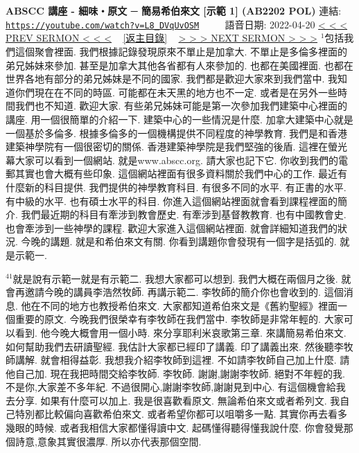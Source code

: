 \documentclass{book}
\begin{document}
\section{}
\label{sec:L8_DVqUvOSM}
\textbf{ABSCC 講座 - 細味‧原文 ─ 簡易希伯來文 [示範 1] (AB2202 POL)}
\newline
\newline
連結: \href{https://youtube.com/watch?v=L8_DVqUvOSM}{\texttt{https://youtube.com/watch?v=L8\_DVqUvOSM}} ~~~~ 語音日期: 2022-04-20
\newline
\newline
\hyperref[sec:GA78znQ7bg4]{\small{< < < PREV SERMON < < <}}
~
\hyperref[sec:index]{\small{[返主目錄]}}
~
\hyperref[sec:efm9yyrZOo0]{\small{> > > NEXT SERMON > > >}}
\newline
\newline
$^{1}$包括我們這個聚會裡面.
我們根據記錄發現原來不單止是加拿大.
不單止是多倫多裡面的弟兄姊妹來參加.
甚至是加拿大其他各省都有人來參加的.
也都在美國裡面.
也都在世界各地有部分的弟兄姊妹是不同的國家.
我們都是歡迎大家來到我們當中.
我知道你們現在在不同的時區.
可能都在未天黑的地方也不一定.
或者是在另外一些時間我們也不知道.
歡迎大家.
有些弟兄姊妹可能是第一次參加我們建築中心裡面的講座.
用一個很簡單的介紹一下.
建築中心的一些情況是什麼.
加拿大建築中心就是一個基於多倫多.
根據多倫多的一個機構提供不同程度的神學教育.
我們是和香港建築神學院有一個很密切的關係.
香港建築神學院是我們堅強的後盾.
這裡在螢光幕大家可以看到一個網站.
就是www.abscc.org.
請大家也記下它.
你收到我們的電郵其實也會大概有些印象.
這個網站裡面有很多資料關於我們中心的工作.
最近有什麼新的科目提供.
我們提供的神學教育科目.
有很多不同的水平.
有正書的水平.
有中級的水平.
也有碩士水平的科目.
你進入這個網站裡面就會看到課程裡面的簡介.
我們最近期的科目有牽涉到教會歷史.
有牽涉到基督教教育.
也有中國教會史.
也會牽涉到一些神學的課程.
歡迎大家進入這個網站裡面.
就會詳細知道我們的狀況.
今晚的講題.
就是和希伯來文有關.
你看到講題你會發現有一個字是括弧的.
就是示範一.

$^{41}$就是說有示範一就是有示範二.
我想大家都可以想到.
我們大概在兩個月之後.
就會再邀請今晚的講員李浩然牧師.
再講示範二.
李牧師的簡介你也會收到的.
這個消息.
他在不同的地方也教授希伯來文.
大家都知道希伯來文是《舊約聖經》裡面一個重要的原文.
今晚我們很榮幸有李牧師在我們當中.
李牧師是非常年輕的.
大家可以看到.
他今晚大概會用一個小時.
來分享耶利米哀歌第三章.
來講簡易希伯來文.
如何幫助我們去研讀聖經.
我估計大家都已經印了講義.
印了講義出來.
然後聽李牧師講解.
就會相得益彰.
我想我介紹李牧師到這裡.
不如請李牧師自己加上什麼.
請他自己加.
現在我把時間交給李牧師.
李牧師.
謝謝,謝謝李牧師.
絕對不年輕的我.
不是你,大家差不多年紀.
不過很開心,謝謝李牧師,謝謝見到中心.
有這個機會給我去分享.
如果有什麼可以加上.
我是很喜歡看原文.
無論希伯來文或者希列文.
我自己特別都比較偏向喜歡希伯來文.
或者希望你都可以咀嚼多一點.
其實你再去看多幾眼的時候.
或者我相信大家都懂得讀中文.
起碼懂得聽得懂我說什麼.
你會發覺那個詩意,意象其實很濃厚.
所以亦代表那個空間.
\end{document}
